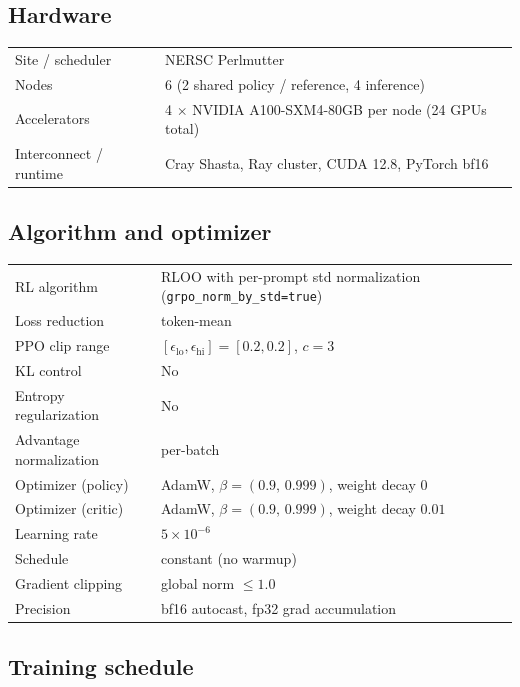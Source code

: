 \documentclass{article}
\begin{document}
\subsection{Hardware}

\begin{tabular}{ll}
\toprule
Site / scheduler        & NERSC Perlmutter \\
Nodes                   & 6 (2 shared policy / reference, 4 inference) \\
Accelerators            & 4 $\times$ NVIDIA A100-SXM4-80GB per node (24 GPUs total) \\
Interconnect / runtime  & Cray Shasta, Ray cluster, CUDA 12.8, PyTorch bf16 \\
\bottomrule
\end{tabular}

\subsection{Algorithm and optimizer}

\begin{tabular}{ll}
\toprule
RL algorithm                       & RLOO with per-prompt std normalization (\texttt{grpo\_norm\_by\_std=true}) \\
Loss reduction                     & token-mean \\
PPO clip range                     & $[\epsilon_{\text{lo}}, \epsilon_{\text{hi}}] = [0.2, 0.2]$, $c=3$ \\
KL control                         & No \\
Entropy regularization             & No \\
Advantage normalization            & per-batch \\
\midrule
Optimizer (policy)                 & AdamW, $\beta=(0.9,\,0.999)$, weight decay $0$ \\
Optimizer (critic)                 & AdamW, $\beta=(0.9,\,0.999)$, weight decay $0.01$ \\
Learning rate                      & $5 \times 10^{-6}$ \\
Schedule                           & constant (no warmup) \\
Gradient clipping                  & global norm $\le 1.0$ \\
Precision                          & bf16 autocast, fp32 grad accumulation \\
\bottomrule
\end{tabular}

\subsection{Training schedule}
\end{document}
